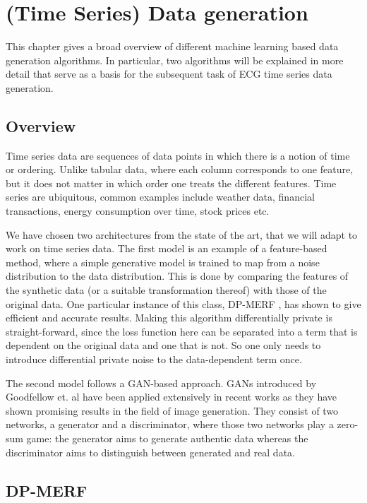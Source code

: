 \section[(Time Series) Data generation]{(Time Series) Data generation}\label{chapter3}

This chapter gives a broad overview of different machine learning based data generation algorithms. In particular, two algorithms will be explained in more detail that serve as a basis for the subsequent task of ECG time series data generation.

\subsection{Overview}

Time series data are sequences of data points in which there is a notion of time or ordering. Unlike tabular data, where each column corresponds to one feature, but it does not matter in which order one treats the different features. Time series are ubiquitous, common examples include weather data, financial transactions, energy consumption over time, stock prices etc.

We have chosen two architectures from the state of the art, that we will adapt to work on time series data. The first model is an example of a feature-based method, where a simple generative model is trained to map from a noise distribution to the data distribution. This is done by comparing the features of the synthetic data (or a suitable transformation thereof) with those of the original data. One particular instance of this class, DP-MERF \parencite{dpmerf}, has shown to give efficient and accurate results. Making this algorithm differentially private is straight-forward, since the loss function here can be separated into a term that is dependent on the original data and one that is not. So one only needs to introduce differential private noise to the data-dependent term once.


The second model follows a GAN-based approach. GANs introduced by Goodfellow et. al \parencite{gan_og} have been applied extensively in recent works as they have shown promising results in the field of image generation. They consist of two networks, a generator and a discriminator, where those two networks play a zero-sum game: the generator aims to generate authentic data whereas the discriminator aims to distinguish between generated and real data.


\subsection{DP-MERF}

